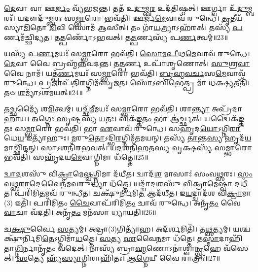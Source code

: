 \-\ul{𑌦𑍇}\-𑌵𑌾 𑌵𑌾 𑌊\-\ul{𑌰𑍍𑌜𑌂} 𑌵𑍍𑌯᳴𑌭𑌜𑌨𑍍𑌤।
𑌤𑌤᳴ 𑌉\-\ul{𑌦𑍁}\-𑌮𑍍𑌬\-\ul{𑌰} 𑌉𑌦᳴𑌤𑌿𑌷𑍍𑌠𑌤𑍍।
𑌊𑌰𑍍𑌗𑍍𑌵𑌾 𑌉᳴\-\ul{𑌦𑍁}\-𑌮𑍍𑌬𑌰𑌃᳴।
𑌯𑌦𑍗𑌦𑍁᳴𑌮𑍍𑌬𑌰𑌃 𑌸\-\ul{𑌮𑍍𑌭𑌾}\-𑌰𑍋 𑌭𑌵᳴𑌤𑌿।
𑌊𑌰𑍍𑌜᳴\-\ul{𑌮𑍇}\-𑌵𑌾𑌵᳴ 𑌰𑍁𑌨𑍍𑌧𑍇।
\-\ul{𑌤𑍃}\-𑌤𑍀𑌯᳴𑌸𑍍𑌯𑌾\-\ul{𑌮𑌿}\-𑌤𑍋 \ul{𑌦𑌿}\-𑌵𑌿 𑌸𑍋𑌮᳴ 𑌆𑌸𑍀𑌤𑍍।
𑌤𑌂 𑌗𑌾᳴\-\ul{𑌯}\-𑌤𑍍𑌰𑍍𑌯𑌾\-𑌽𑌹᳴𑌰𑌤𑍍।
𑌤𑌸𑍍𑌯᳴ \ul{𑌪}\-𑌰𑍍𑌣𑌮᳴𑌚𑍍𑌛𑌿𑌦𑍍𑌯𑌤।
𑌤\-\ul{𑌤𑍍𑌪}\-𑌰𑍍𑌣𑍋᳴\-𑌽𑌭𑌵𑌤𑍍।
𑌤\-\ul{𑌤𑍍𑌪}\-𑌰𑍍𑌣𑌸𑍍𑌯᳴ 𑌪\-\ul{𑌰𑍍𑌣}\-𑌤𑍍𑌵𑌮𑍍॥23॥

𑌯𑌸𑍍𑌯᳴ 𑌪\-\ul{𑌰𑍍𑌣}\-𑌮𑌯𑌃᳴ 𑌸\-\ul{𑌮𑍍𑌭𑌾}\-𑌰𑍋 𑌭𑌵᳴𑌤𑌿।
\-\ul{𑌸𑍋}\-\-\ul{𑌮}\-\-\ul{𑌪𑍀}\-𑌥\-\ul{𑌮𑍇}\-𑌵𑌾𑌵᳴ 𑌰𑍁𑌨𑍍𑌧𑍇।
\-\ul{𑌦𑍇}\-𑌵𑌾 𑌵𑍈 𑌬𑍍𑌰𑌹𑍍𑌮᳴𑌨𑍍𑌨𑌵𑌦𑌨𑍍𑌤।
𑌤\-\ul{𑌤𑍍𑌪}\-𑌰𑍍𑌣 𑌉𑌪𑌾᳴𑌶𑍃𑌣𑍋𑌤𑍍।
\-\ul{𑌸𑍁}\-𑌶𑍍𑌰\-\ul{𑌵𑌾} 𑌵𑍈 𑌨𑌾𑌮᳴।
𑌯𑌤𑍍𑌪᳴\-\ul{𑌰𑍍𑌣}\-𑌮𑌯𑌃᳴ 𑌸\-\ul{𑌮𑍍𑌭𑌾}\-𑌰𑍋 𑌭𑌵᳴𑌤𑌿।
\-\ul{𑌬𑍍𑌰}\-\-\ul{𑌹𑍍𑌮}\-\-\ul{𑌵}\-\-\ul{𑌰𑍍𑌚}\-𑌸\-\ul{𑌮𑍇}\-𑌵𑌾𑌵᳴ 𑌰𑍁𑌨𑍍𑌧𑍇।
\-\ul{𑌪𑍍𑌰}\-𑌜𑌾𑌪᳴𑌤𑌿\-\ul{𑌰}\-𑌗𑍍𑌨𑌿𑌮᳴\-𑌸𑍃𑌜𑌤।
𑌸𑍋᳴𑌽𑌬𑌿\-\ul{𑌭𑍇}\-𑌤𑍍𑌪𑍍𑌰 𑌮𑌾᳴ 𑌧\-\ul{𑌕𑍍𑌷𑍍𑌯}\-𑌤𑍀𑌤𑌿᳴।
𑌤𑍞 \ul{𑌶}\-𑌮𑍍𑌯𑌾᳴\-𑌽𑌶𑌮𑌯𑌤𑍍॥24॥

𑌤\-\ul{𑌚𑍍𑌛}\-𑌮𑍍𑌯𑍈᳴ 𑌶\-\ul{𑌮𑌿}\-𑌤𑍍𑌵𑌮𑍍।
𑌯𑌚𑍍𑌛᳴\-\ul{𑌮𑍀}\-𑌮𑌯𑌃᳴ 𑌸\-\ul{𑌮𑍍𑌭𑌾}\-𑌰𑍋 𑌭𑌵᳴𑌤𑌿।
𑌶𑌾\-\ul{𑌨𑍍𑌤𑍍𑌯𑌾} 𑌅𑌪𑍍𑌰᳴𑌦𑌾𑌹𑌾𑌯।
\-\ul{𑌅}\-𑌗𑍍𑌨𑍇𑌃 \ul{𑌸𑍃}\-𑌷𑍍𑌟𑌸𑍍𑌯᳴ \ul{𑌯}\-𑌤𑌃।
𑌵𑌿𑌕᳴𑌙𑍍𑌕\-\ul{𑌤𑌂} 𑌭𑌾 𑌆॑𑌰𑍍𑌚𑍍𑌛𑌤𑍍।
𑌯𑌦𑍍𑌵𑍈𑌕᳴𑌙𑍍𑌕𑌤𑌃 𑌸\-\ul{𑌮𑍍𑌭𑌾}\-𑌰𑍋 𑌭𑌵᳴𑌤𑌿।
𑌭𑌾 \ul{𑌏}\-𑌵𑌾𑌵᳴ 𑌰𑍁𑌨𑍍𑌧𑍇।
𑌸𑌹𑍃᳴𑌦\-\ul{𑌯𑍋}\-\-𑌽𑌗𑍍𑌨𑌿\-\ul{𑌰𑌾}\-𑌧𑍇\-\ul{𑌯} 𑌇𑌤𑍍𑌯𑌾᳴𑌹𑍁𑌃।
\-\ul{𑌮}\-𑌰𑍁\-\ul{𑌤𑍋}\-\-𑌽𑌦𑍍𑌭𑌿\-\ul{𑌰}\-𑌗𑍍𑌨𑌿𑌮᳴𑌤𑌮𑌯𑌨𑍍।
𑌤𑌸𑍍𑌯᳴ \ul{𑌤𑌾}\-𑌨𑍍𑌤\-\ul{𑌸𑍍𑌯} 𑌹𑍃𑌦᳴\-\ul{𑌯}\-𑌮𑌾𑌚𑍍𑌛𑌿᳴𑌨𑍍𑌦𑌨𑍍।
𑌸𑌾𑌽𑌶𑌨𑌿᳴𑌰𑌭𑌵𑌤𑍍।
𑌯\-\ul{𑌦}\-𑌶𑌨𑌿᳴𑌹𑌤𑌸𑍍𑌯 \ul{𑌵𑍃}\-𑌕𑍍𑌷𑌸𑍍𑌯᳴ 𑌸\-\ul{𑌮𑍍𑌭𑌾}\-𑌰𑍋 𑌭𑌵᳴𑌤𑌿।
𑌸𑌹𑍃᳴𑌦𑌯\-\ul{𑌮𑍇}\-𑌵𑌾𑌗𑍍𑌨𑌿𑌮𑌾 𑌧᳴𑌤𑍍𑌤𑍇॥25॥

\-\ul{𑌦𑍍𑌵𑌾}\-\-\ul{𑌦}\-𑌶𑌸𑍁᳴ 𑌵𑌿\-\ul{𑌕𑍍𑌰𑌾}\-𑌮𑍇\-\ul{𑌷𑍍𑌵}\-𑌗𑍍𑌨𑌿𑌮𑌾 𑌦᳴𑌧𑍀𑌤।
𑌦𑍍𑌵𑌾𑌦᳴\-\ul{𑌶} 𑌮𑌾𑌸𑌾𑌃॑ 𑌸𑌂𑌵\-\ul{𑌥𑍍𑌸}\-𑌰𑌃।
\-\ul{𑌸𑌂}\-\-\ul{𑌵}\-\-\ul{𑌥𑍍𑌸}\-𑌰𑌾\-\ul{𑌦𑍇}\-𑌵𑍈𑌨᳴𑌮\-\ul{𑌵}\-𑌰𑍁𑌦𑍍𑌧𑍍𑌯𑌾 𑌧᳴𑌤𑍍𑌤𑍇।
𑌯𑌦𑍍𑌦𑍍𑌵𑌾᳴\-\ul{𑌦}\-𑌶𑌸𑍁᳴ 𑌵𑌿\-\ul{𑌕𑍍𑌰𑌾}\-𑌮𑍇\-\ul{𑌷𑍍𑌵𑌾} 𑌦𑌧𑍀᳴𑌤।
𑌪𑌰𑌿᳴𑌮𑌿\-\ul{𑌤}\-𑌮𑌵᳴ 𑌰𑍁𑌨𑍍𑌧𑍀𑌤।
𑌚𑌕𑍍𑌷𑍁᳴𑌰𑍍𑌨𑌿𑌮𑌿\-\ul{𑌤} 𑌆𑌦᳴𑌧𑍀𑌤।
𑌇\-\ul{𑌯}\-𑌦𑍍𑌦𑍍𑌵𑌾𑌦᳴𑌶 𑌵𑌿\-\ul{𑌕𑍍𑌰𑌾}\-𑌮𑌾(3) 𑌇𑌤𑌿᳴।
𑌪𑌰𑌿᳴𑌮𑌿𑌤𑌂 \ul{𑌚𑍈}\-𑌵𑌾𑌪᳴𑌰𑌿𑌮𑌿\-\ul{𑌤𑌂} 𑌚𑌾𑌵᳴ 𑌰𑍁𑌨𑍍𑌧𑍇।
𑌅𑌨𑍃᳴\-\ul{𑌤𑌂} 𑌵𑍈 \ul{𑌵𑌾}\-𑌚𑌾 𑌵᳴𑌦𑌤𑌿।
𑌅𑌨𑍃᳴\-\ul{𑌤𑌂} 𑌮𑌨᳴𑌸𑌾 𑌧𑍍𑌯𑌾𑌯𑌤𑌿॥26॥

𑌚\-\ul{𑌕𑍍𑌷𑍁}\-𑌰𑍍𑌵𑍈 \ul{𑌸}\-𑌤𑍍𑌯𑌮𑍍।
𑌅𑌦𑍍𑌰𑌾(3)𑌗𑌿𑌤𑍍𑌯𑌾᳴𑌹।
𑌅𑌦᳴𑌰𑍍\mbox{}\-\ul{𑌶}\-𑌮𑌿𑌤𑌿᳴।
𑌤\-\ul{𑌥𑍍𑌸}\-𑌤𑍍𑌯𑌮𑍍।
𑌯𑌶𑍍𑌚𑌕𑍍𑌷𑍁᳴𑌰𑍍𑌨𑌿𑌮𑌿\-\ul{𑌤𑍇}\-\-𑌽𑌗𑍍𑌨𑌿𑌮𑌾᳴\-\ul{𑌧}\-𑌤𑍍𑌤𑍇।
\-\ul{𑌸}\-𑌤𑍍𑌯 \ul{𑌏}\-𑌵𑍈\-\ul{𑌨}\-𑌮𑌾 𑌧᳴𑌤𑍍𑌤𑍇।
𑌤\-\ul{𑌸𑍍𑌮𑌾}\-𑌦𑌾𑌹𑌿᳴𑌤𑌾\-\ul{𑌗𑍍𑌨𑌿}\-𑌰𑍍𑌨𑌾𑌨𑍃᳴𑌤𑌂 𑌵𑌦𑍇𑌤𑍍।
𑌨𑌾𑌸𑍍𑌯᳴ 𑌬𑍍𑌰𑌾\-\ul{𑌹𑍍𑌮}\-𑌣𑍋\-𑌽𑌨𑌾॑𑌶𑍍𑌵𑌾\-\ul{𑌨𑍍𑌗𑍃}\-𑌹𑍇 𑌵᳴𑌸𑍇𑌤𑍍।
\-\ul{𑌸}\-𑌤𑍍𑌯𑍇 𑌹𑍍𑌯᳴\-\ul{𑌸𑍍𑌯𑌾}\-𑌗𑍍𑌨𑌿𑌰𑌾𑌹𑌿᳴𑌤𑌃।
\-\ul{𑌆}\-\-\ul{𑌗𑍍𑌨𑍇}\-𑌯𑍀 𑌵𑍈 𑌰𑌾𑌤𑍍𑌰𑌿𑌃᳴॥27॥

